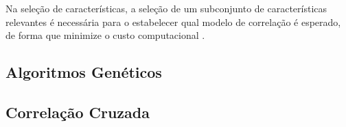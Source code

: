 Na seleção de características, a seleção de um subconjunto de características relevantes é necessária para o estabelecer qual modelo de correlação é esperado, de forma que minimize o custo computacional \cite{Li2009}.


\subsection{Algoritmos Genéticos}
\subsection{Correlação Cruzada}